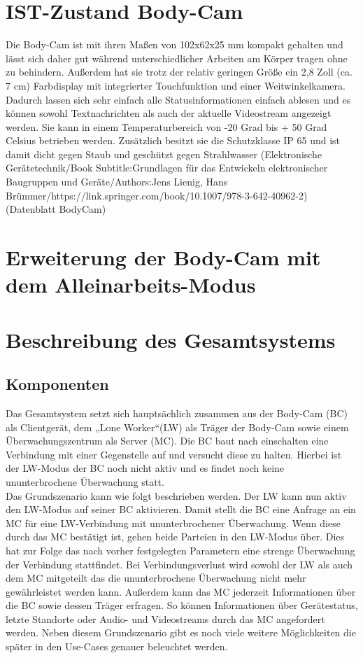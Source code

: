 \documentclass[thesis.tex]{subfiles}
\begin{document}
\section{IST-Zustand Body-Cam}

Die Body-Cam ist mit ihren Maßen von 102x62x25 mm kompakt gehalten und lässt sich daher gut während unterschiedlicher Arbeiten am Körper tragen ohne zu behindern.
Außerdem hat sie trotz der relativ geringen Größe ein 2,8 Zoll (ca. 7 cm) Farbdisplay mit integrierter Touchfunktion und einer Weitwinkelkamera. Dadurch lassen sich sehr einfach alle Statusinformationen einfach ablesen und es können sowohl Textnachrichten als auch der aktuelle Videostream angezeigt werden. Sie kann in einem Temperaturbereich von -20 Grad bis + 50 Grad Celsius betrieben werden. Zusätzlich besitzt sie die Schutzklasse IP 65 und ist damit dicht gegen Staub und geschützt gegen Strahlwasser (Elektronische Gerätetechnik/Book Subtitle:Grundlagen für das Entwickeln elektronischer Baugruppen und Geräte/Authors:Jens Lienig, Hans Brümmer/https://link.springer.com/book/10.1007/978-3-642-40962-2) (Datenblatt BodyCam)

\section{Erweiterung der Body-Cam mit dem Alleinarbeits-Modus}
\section{Beschreibung des Gesamtsystems}

\subsection{Komponenten}
Das Gesamtsystem setzt sich hauptsächlich zusammen aus der Body-Cam (BC) als Clientgerät, dem „Lone Worker“(LW)
als Träger der Body-Cam sowie einem Überwachungszentrum als Server (MC).
Die BC baut nach einschalten eine Verbindung mit einer Gegenstelle auf und versucht diese zu halten.
Hierbei ist der LW-Modus der BC noch nicht aktiv und es findet noch keine ununterbrochene Überwachung statt.
\\

Das Grundszenario kann wie folgt beschrieben werden. Der LW kann nun aktiv den LW-Modus auf seiner BC aktivieren.
Damit stellt die BC eine Anfrage an ein MC für eine LW-Verbindung mit ununterbrochener Überwachung.
Wenn diese durch das MC bestätigt ist, gehen beide Parteien in den LW-Modus über.
Dies hat zur Folge das nach vorher festgelegten Parametern eine strenge Überwachung der Verbindung stattfindet.
Bei Verbindungsverlust wird sowohl der LW als auch dem MC mitgeteilt das die ununterbrochene Überwachung nicht mehr gewährleistet werden kann.
Außerdem kann das MC jederzeit Informationen über die BC sowie dessen Träger erfragen.
So können Informationen über Gerätestatus, letzte Standorte oder Audio- und Videostreams durch das MC angefordert werden.
Neben diesem Grundszenario gibt es noch viele weitere Möglichkeiten die später in den Use-Cases genauer beleuchtet werden.
\\
\end{document}
